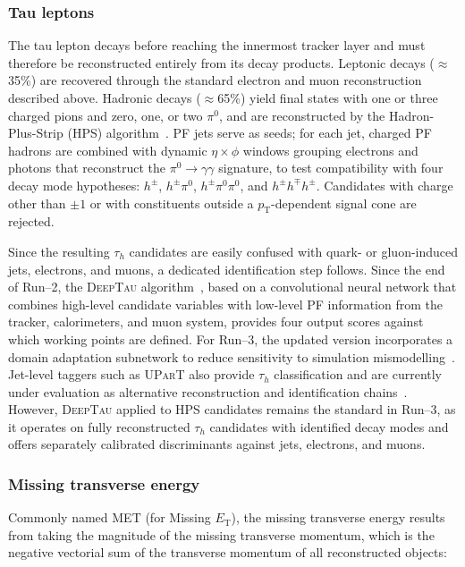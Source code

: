 \subsubsection{Tau leptons}

The tau lepton decays before reaching the innermost tracker layer and must therefore be reconstructed entirely from its decay products. Leptonic decays ($\approx$35\%) are recovered through the standard electron and muon reconstruction described above. Hadronic decays ($\approx$65\%) yield final states with one or three charged pions and zero, one, or two $\pi^0$, and are reconstructed by the Hadron-Plus-Strip (HPS) algorithm~\cite{TauPaper}. PF jets serve as seeds; for each jet, charged PF hadrons are combined with dynamic $\eta \times \phi$ windows grouping electrons and photons that reconstruct the $\pi^0 \to \gamma\gamma$ signature, to test compatibility with four decay mode hypotheses: $h^\pm$, $h^\pm\pi^0$, $h^\pm\pi^0\pi^0$, and $h^\pm h^\mp h^\pm$. Candidates with charge other than $\pm 1$ or with constituents outside a $p_{\mathrm{T}}$-dependent signal cone are rejected.

Since the resulting $\tau_h$ candidates are easily confused with quark- or gluon-induced jets, electrons, and muons, a dedicated identification step follows. Since the end of Run--2, the \textsc{DeepTau} algorithm~\cite{DeepTau}, based on a convolutional neural network that combines high-level candidate variables with low-level PF information from the tracker, calorimeters, and muon system, provides four output scores against which working points are defined. For Run--3, the updated version incorporates a domain adaptation subnetwork to reduce sensitivity to simulation mismodelling~\cite{DeepTauRun3}. Jet-level taggers such as \textsc{UParT} also provide $\tau_h$ classification and are currently under evaluation as alternative reconstruction and identification chains~\cite{CMS-DP-2025-073}. However, \textsc{DeepTau} applied to HPS candidates remains the standard in Run--3, as it operates on fully reconstructed $\tau_h$ candidates with identified decay modes and offers separately calibrated discriminants against jets, electrons, and muons.


\subsubsection{Missing transverse energy}
\label{subsubsec:METdef}

Commonly named MET (for Missing $E_{\mathrm{T}}$), the missing transverse energy results from taking the magnitude of the missing transverse momentum, which is the negative vectorial sum of the transverse momentum of all reconstructed objects:

